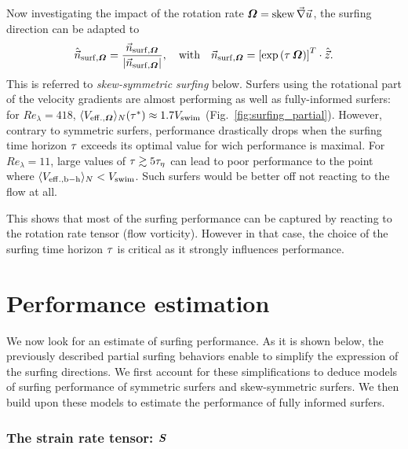 Now investigating the impact of the rotation rate $\boldsymbol{\varOmega} = \operatorname{skew} \vec{\nabla} \vec{u}$, the surfing direction can be adapted to
\begin{equation}\label{turb:eq:surf_partial_asym}
	\hat{\vec{n}}_{\mathrm{surf}, \boldsymbol{\varOmega}} = \frac{\vec{n}_{\mathrm{surf}, \boldsymbol{\varOmega}}}{\lvert\vec{n}_{\mathrm{surf}, \boldsymbol{\varOmega}}\rvert}, \quad \text{with} \quad \vec{n}_{\mathrm{surf}, \boldsymbol{\varOmega}} = \left[ \exp \left( \tau \, \boldsymbol{\varOmega} \right) \right]^T \cdot \hat{\vec{z}}.
\end{equation}
This is referred to \textit{skew-symmetric surfing} below.
Surfers using the rotational part of the velocity gradients are almost performing as well as fully-informed surfers: for $\mathit{Re}_{\lambda} = 418$, $\langle V_{\mathrm{eff.}, \boldsymbol{\varOmega}} \rangle_{N}(\tau^*) \approx 1.7 V_{\mathrm{swim}}$ (Fig.~\ref{fig:surfing_partial}).
However, contrary to symmetric surfers, performance drastically drops when the surfing time horizon $\tau$ exceeds its optimal value for wich performance is maximal.
For $\mathit{Re}_{\lambda} = 11$, large values of $\tau \gtrsim 5\tau_{\eta}$ can lead to poor performance to the point where $\langle V_{\mathrm{eff.}, \mathrm{b-h}} \rangle_{N} < V_{\mathrm{swim}}$. 
Such surfers would be better off not reacting to the flow at all.

This shows that most of the surfing performance can be captured by reacting to the rotation rate tensor (flow vorticity).
However in that case, the choice of the surfing time horizon $\tau$ is critical as it strongly influences performance.

\section{Performance estimation}\label{sec:perf_estimation}

We now look for an estimate of surfing performance.
As it is shown below, the previously described partial surfing behaviors enable to simplify the expression of the surfing directions.
We first account for these simplifications to deduce models of surfing performance of symmetric surfers and skew-symmetric surfers.
We then build upon these models to estimate the performance of fully informed surfers.

\subsubsection{The strain rate tensor: $\boldsymbol{S}$}

